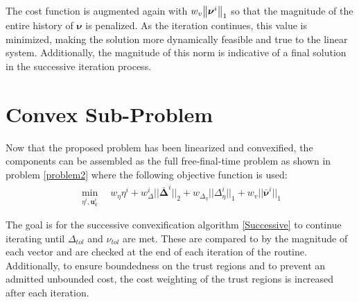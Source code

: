 \documentclass[conf]{new-aiaa}
\begin{document}
The cost function is augmented again with $w_v \norm{\bm{\nu}^i}_1$ so that the magnitude of the entire history of $\bm{\nu}$ is penalized. As the iteration continues, this value is minimized, making the solution more dynamically feasible and true to the linear system. Additionally, the magnitude of this norm is indicative of a final solution in the successive iteration process.

\section{Convex Sub-Problem}
Now that the proposed problem has been linearized and convexified, the components can be assembled as the full free-final-time problem as shown in problem \ref{problem2} where the following objective function is used:
\begin{align}
	\min_{\eta^i, \mathbf{u}_k^i} \quad w_\eta \eta^i + w_\Delta^i || \bm{\bar{\Delta}}^i ||_2 + w_{\Delta_\eta} || \Delta_\eta^i ||_1 + w_v || \bar{\bm{\nu}}^i ||_1
\end{align}

The goal is for the successive convexification algorithm \ref{Successive} to continue iterating until $\Delta_{tol}$ and $\nu_{tol}$ are met. These are compared to by the magnitude of each vector and are checked at the end of each iteration of the routine. Additionally, to ensure boundedness on the trust regions and to prevent an admitted unbounded cost, the cost weighting of the trust regions is increased after each iteration.
\end{document}
